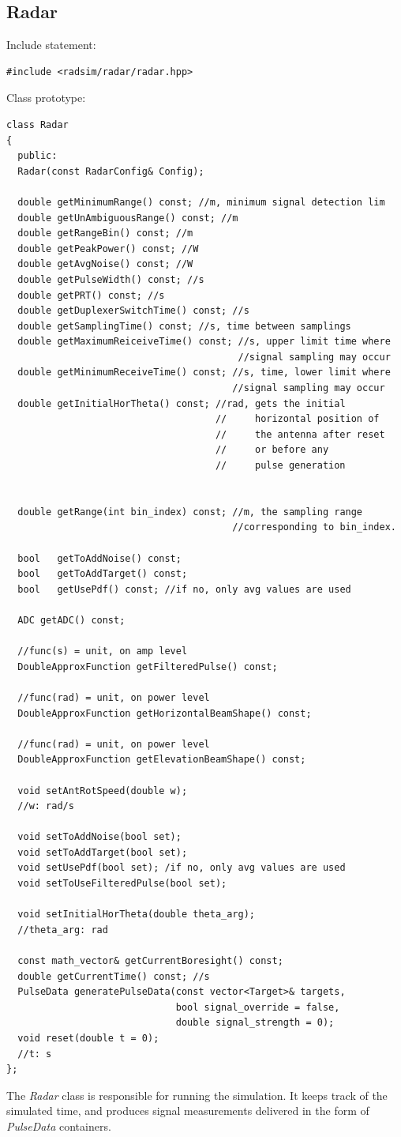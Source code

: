 \documentclass[letterpaper]{book}
\begin{document}
\subsection{Radar}
Include statement:
\begin{lstlisting}
#include <radsim/radar/radar.hpp>
\end{lstlisting}
Class prototype:
\begin{lstlisting}
class Radar 
{
  public:
  Radar(const RadarConfig& Config);  

  double getMinimumRange() const; //m, minimum signal detection lim
  double getUnAmbiguousRange() const; //m
  double getRangeBin() const; //m
  double getPeakPower() const; //W
  double getAvgNoise() const; //W
  double getPulseWidth() const; //s
  double getPRT() const; //s
  double getDuplexerSwitchTime() const; //s
  double getSamplingTime() const; //s, time between samplings
  double getMaximumReiceiveTime() const; //s, upper limit time where
                                         //signal sampling may occur
  double getMinimumReceiveTime() const; //s, time, lower limit where
                                        //signal sampling may occur
  double getInitialHorTheta() const; //rad, gets the initial 
                                     //     horizontal position of 
                                     //     the antenna after reset 
                                     //     or before any
                                     //     pulse generation


  double getRange(int bin_index) const; //m, the sampling range 
                                        //corresponding to bin_index.

  bool   getToAddNoise() const;
  bool   getToAddTarget() const;
  bool   getUsePdf() const; //if no, only avg values are used

  ADC getADC() const;

  //func(s) = unit, on amp level
  DoubleApproxFunction getFilteredPulse() const;

  //func(rad) = unit, on power level
  DoubleApproxFunction getHorizontalBeamShape() const;

  //func(rad) = unit, on power level
  DoubleApproxFunction getElevationBeamShape() const;

  void setAntRotSpeed(double w);
  //w: rad/s

  void setToAddNoise(bool set);
  void setToAddTarget(bool set);
  void setUsePdf(bool set); /if no, only avg values are used
  void setToUseFilteredPulse(bool set);

  void setInitialHorTheta(double theta_arg); 
  //theta_arg: rad

  const math_vector& getCurrentBoresight() const;
  double getCurrentTime() const; //s
  PulseData generatePulseData(const vector<Target>& targets, 
                              bool signal_override = false, 
                              double signal_strength = 0);
  void reset(double t = 0);
  //t: s
};
\end{lstlisting}
The \textit{Radar} class is responsible for running the simulation. It keeps track of the simulated time, and produces signal measurements delivered in the form of \textit{PulseData} containers. 
\end{document}
